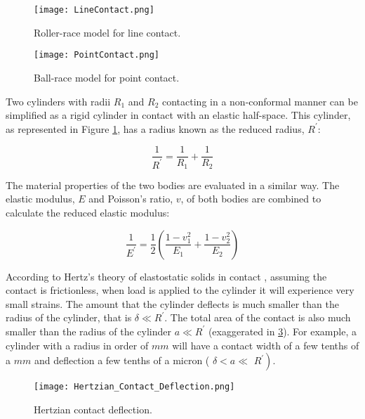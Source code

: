 \begin{figure}
	\centerline{\texttt{[image: LineContact.png]}}
	\caption[Roller-race model for line contact.]{Roller-race model for line contact. \cite{Zaretsky2016}}
	\label{LineContact}
\end{figure}

\begin{figure}
	\centerline{\texttt{[image: PointContact.png]}}
	\caption[Ball-race model for point contact.]{Ball-race model for point contact. \cite{Zaretsky2016}}
	\label{PointContact}
\end{figure}

Two cylinders with radii $R_1$ and $R_2$ contacting in a non-conformal manner can be simplified as a rigid cylinder in contact with an elastic half-space. This cylinder, as represented in Figure \ref{LineContact}, has a radius known as the reduced radius, $R^{\prime}$:

\begin{equation}\label{eq2.1}
	\frac{1}{R^{\prime}}=\frac{1}{R_1}+\frac{1}{R_2}
\end{equation}

The material properties of the two bodies are evaluated in a similar way. The elastic modulus, $E$ and Poisson's ratio, $v$, of both bodies are combined to calculate the reduced elastic modulus:

\begin{equation}\label{eq2.2}
	\frac{1}{E^{\prime}}=\frac{1}{2}\left(\frac{1-v_1^2}{E_1}+\frac{1-v_2^2}{E_2}\right)
\end{equation}

According to Hertz's theory of elastostatic solids in contact \cite{Hertz1881}, assuming the contact is frictionless, when load is applied to the cylinder it will experience very small strains. The amount that the cylinder deflects is much smaller than the radius of the cylinder, that is $\delta \ll R^{\prime}$. The total area of the contact is also much smaller than the radius of the cylinder $a \ll R^{\prime}$ (exaggerated in \ref{HertzianContactDeflection}). For example, a cylinder with a radius in order of $mm$ will have a contact width of a few tenths of a $mm$ and deflection a few tenths of a micron ( $\delta<a \ll$ $\left.R^{\prime}\right)$.

\begin{figure}
	\centerline{\texttt{[image: Hertzian\_Contact\_Deflection.png]}}
	\caption{Hertzian contact deflection.}
	\label{HertzianContactDeflection}
\end{figure}


